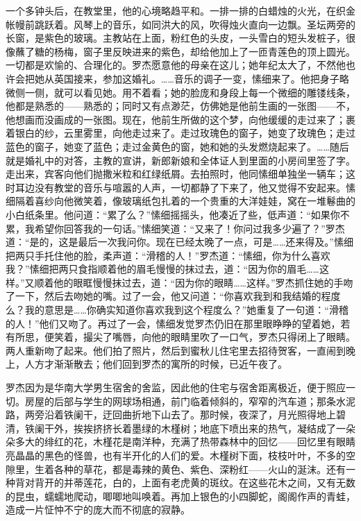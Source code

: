 \par 一个多钟头后，在教堂里，他的心境略趋平和。一排一排的白蜡烛的火光，在织金帐幔前跳跃着。风琴上的音乐，如同洪大的风，吹得烛火直向一边飘。圣坛两旁的长窗，是紫色的玻璃。主教站在上面，粉红色的头皮，一头雪白的短头发桩子，很像蘸了糖的杨梅，窗子里反映进来的紫色，却给他加上了一匝青莲色的顶上圆光。一切都是欢愉的、合理化的。罗杰愿意他的母亲在这儿；她年纪太大了，不然他也许会把她从英国接来，参加这婚礼。……音乐的调子一变，愫细来了。他把身子略微侧一侧，就可以看见她。用不着看；她的脸庞和身段上每一个微细的雕镂线条，他都是熟悉的——熟悉的；同时又有点渺茫，仿佛她是他前生画的一张图——不，他想画而没画成的一张图。现在，他前生所做的这个梦，向他缓缓的走过来了；裹着银白的纱，云里雾里，向他走过来了。走过玫瑰色的窗子，她变了玫瑰色；走过蓝色的窗子，她变了蓝色；走过金黄色的窗，她和她的头发燃烧起来了。……随后就是婚礼中的对答，主教的宣讲，新郎新娘和全体证人到里面的小房间里签了字。走出来，宾客向他们抛撒米粒和红绿纸屑。去拍照时，他同愫细单独坐一辆车；这时耳边没有教堂的音乐与喧嚣的人声，一切都静了下来了，他又觉得不安起来。愫细隔着喜纱向他微笑着，像玻璃纸包扎着的一个贵重的大洋娃娃，窝在一堆鬈曲的小白纸条里。他问道：“累了么？”愫细摇摇头，他凑近了些，低声道：“如果你不累，我希望你回答我的一句话。”愫细笑道：“又来了！你问过我多少遍了？”罗杰道：“是的，这是最后一次我问你。现在已经太晚了一点，可是……还来得及。”愫细把两只手托住他的脸，柔声道：“滑稽的人！”罗杰道：“愫细，你为什么喜欢我？”愫细把两只食指顺着他的眉毛慢慢的抹过去，道：“因为你的眉毛……这样。”又顺着他的眼眶慢慢抹过去，道：“因为你的眼睛……这样。”罗杰抓住她的手吻了一下，然后去吻她的嘴。过了一会，他又问道：“你喜欢我到和我结婚的程度么？我的意思是……你确实知道你喜欢我到这个程度么？”她重复了一句道：“滑稽的人！”他们又吻了。再过了一会，愫细发觉罗杰仍旧在那里眼睁睁的望着她，若有所思，便笑着，撮尖了嘴唇，向他的眼睛里吹了一口气，罗杰只得闭上了眼睛。两人重新吻了起来。他们拍了照片，然后到蜜秋儿住宅里去招待贺客，一直闹到晚上，人方才渐渐散去；他们回到罗杰的寓所的时候，已近午夜了。
\par 罗杰因为是华南大学男生宿舍的舍监，因此他的住宅与宿舍距离极近，便于照应一切。房屋的后部与学生的网球场相通，前门临着倾斜的，窄窄的汽车道；那条水泥路，两旁沿着铁阑干，迂回曲折地下山去了。那时候，夜深了，月光照得地上碧清，铁阑干外，挨挨挤挤长着墨绿的木槿树；地底下喷出来的热气，凝结成了一朵朵多大的绯红的花，木槿花是南洋种，充满了热带森林中的回忆——回忆里有眼睛亮晶晶的黑色的怪兽，也有半开化的人们的爱。木槿树下面，枝枝叶叶，不多的空隙里，生着各种的草花，都是毒辣的黄色、紫色、深粉红——火山的涎沫。还有一种背对背开的并蒂莲花，白的，上面有老虎黄的斑纹。在这些花木之间，又有无数的昆虫，蠕蠕地爬动，唧唧地叫唤着。再加上银色的小四脚蛇，阁阁作声的青蛙，造成一片怔忡不宁的庞大而不彻底的寂静。

